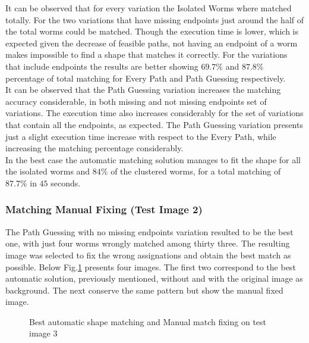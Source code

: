 It can be observed that for every variation the Isolated Worms where matched
totally. For the two variations that have missing endpoints just around
the half of the total worms could be matched. Though the execution time is
lower, which is expected given the decrease of feasible paths, not having an
endpoint of a worm makes impossible to find a shape that matches it correctly.
For the variations that include endpoints the results are better showing 
$69.7\%$ and $87.8\%$ percentage of total matching for Every Path and 
Path Guessing respectively. \\
It can be observed that the Path Guessing variation
increases the matching accuracy considerable, in both missing and not missing
endpoints set of variations. The execution time also increases considerably
for the set of variations that contain all the endpoints, as expected. 
The Path Guessing variation presents just a slight execution time increase with
respect to the Every Path, while increasing the matching percentage 
considerably.\\
In the best case the automatic matching solution manages to fit the shape
for all the isolated worms and $84\%$ of the clustered worms, for 
a total matching of $87.7\%$ in $45$ seconds.

\subsubsection*{Matching Manual Fixing (Test Image 2)}

The Path Guessing with no missing endpoints variation resulted to be the 
best one, with just four worms wrongly matched among thirty three. The 
resulting image was selected to fix the wrong assignations and obtain
the best match as possible.
Below Fig.\ref{fig:best2} presents four images. The first two correspond to the
best automatic solution, previously mentioned, without and with the original
image as background. The next conserve the same pattern but show the manual
fixed image.

\begin{figure}[h!]
  \centering
\qquad
\qquad
\qquad

\caption{Best automatic shape matching and Manual match fixing on test image 3}
\label{fig:best2}
\end{figure}


